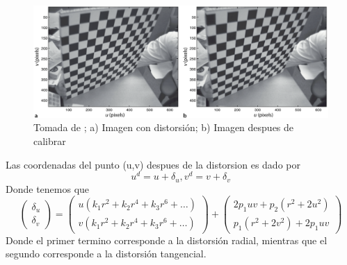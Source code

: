 \begin{figure}[h]
	\begin{center}
		\includegraphics[width=0.95 \textwidth]{Contenido/Cuerpo/Capitulo2/Fig20.eps}
		\caption{Tomada de \cite{Book:Corke2011}; a) Imagen con distorsión; b) Imagen despues de calibrar}
		\label{fig:20}
	\end{center}
\end{figure}

Las coordenadas del punto (u,v) despues de la distorsion es dado por
\begin{equation}
	u^d = u + \delta_u, v^d = v+\delta_v
\end{equation}
Donde tenemos que
\begin{equation}
	\left(
	\begin{array}{c}
			\delta_u \\
			\delta_v
		\end{array}
	\right)
	=
	\left(
	\begin{array}{c}
			u(k_1r^2 + k_2r^4 + k_3r^6 + \dots) \\
			v(k_1r^2 + k_2r^4 + k_3r^6 + \dots)
		\end{array}
	\right)
	+
	\left(
	\begin{array}{c}
			2p_1uv + p_2(r^2+2u^2) \\
			p_1(r^2+2v^2) + 2p_1uv
		\end{array}
	\right)
\end{equation}
Donde el primer termino corresponde a la distorsión radial, mientras que el segundo corresponde a la distorsión tangencial.

